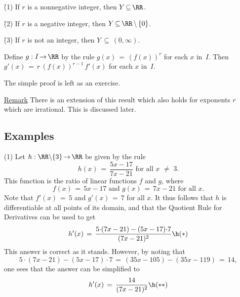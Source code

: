 \VA

        \h (1) If $r$ is a nonnegative integer, then $Y \,{\subseteq}\, {\RR}$.

        \h (2) If $r$ is a negative integer, then $Y \,{\subseteq}\, {\RR}\,{\setminus}\,\{0\}$.

        \h (3) If $r$ is not an integer, then $Y \,{\subseteq}\,(0,{\infty})$.

\VA

\noindent Define $g:I \,{\rightarrow}\, {\RR}$ by the rule $g(x) \,=\, (f(x))^{r}$ for each $x$ in~$I$.
    Then $g'(x) \,=\, r\,(f(x))^{r-1}\,f'(x)$ for each $x$ in~$I$.

\V
        The simple proof is left as an exercise. \Q %

\V


        \underline{Remark} There is an extension of this result which also holds for exponents $r$ which are irrational. This is discussed later.

\VV

            \subsection{\small{\bf Examples}}
            \label{ExampE30.57}

\V

\hspace*{\parindent}(1) Let $h:{\RR}{\setminus}\{3\} \,{\rightarrow}\, {\RR}$ be given by the rule
        \begin{displaymath}
        h(x) \,=\, \frac{5x-17}{7x-21} \mbox{ for all $x \,\,{\neq}\,\, 3$}.
        \end{displaymath}
    This function is the ratio of linear functions $f$ and $g$, where
        \begin{displaymath}
        f(x) \,=\, 5x-17 \mbox{ and } g(x) \,=\, 7x-21 \mbox{ for all $x$}.
        \end{displaymath}
    Note that $f'(x) \,=\, 5$ and $g'(x) \,=\, 7$ for all $x$. It thus follows that $h$ is differentiable at all points of its domain, and that the Quotient Rule for Derivatives can be used to get
        \begin{displaymath}
        h'(x) \,=\, \frac{5{\cdot}(7x-21) - (5x-17){\cdot}7}{(7x-21)^{2}} \h ({\ast})
        \end{displaymath}
    This answer is correct as it stands. However, by noting that
        \begin{displaymath}
        5{\cdot}(7x-21) - (5x-17){\cdot}7 \,=\, (35x - 105)  - (35x - 119)  \,=\, 14,
        \end{displaymath}
     one sees that the answer can be simplified to
        \begin{displaymath}
        h'(x) \,=\, \frac{14}{(7x-21)^{2}} \h ({\ast}{\ast})
        \end{displaymath}

